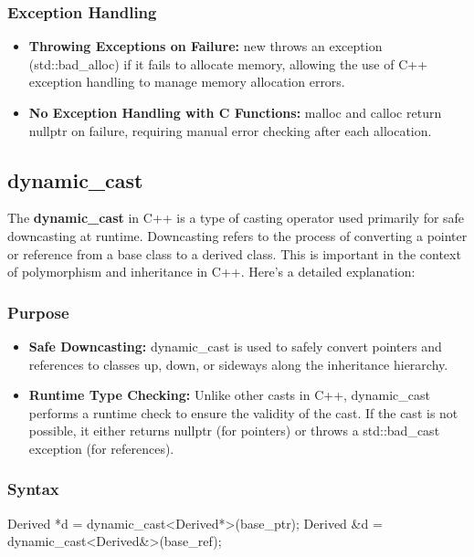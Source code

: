 \documentclass{report}
\begin{document}
    \bigbreak \noindent 
    \subsubsection{Exception Handling}
    \begin{itemize}
        \item \textbf{Throwing Exceptions on Failure:} new throws an exception (std::bad\_alloc) if it fails to allocate memory, allowing the use of C++ exception handling to manage memory allocation errors.
        \item \textbf{No Exception Handling with C Functions:} malloc and calloc return nullptr on failure, requiring manual error checking after each allocation.
    \end{itemize}

    \pagebreak 
    \bigbreak \noindent 

    \subsection{dynamic\_cast}
    \bigbreak \noindent 
    \begin{concept}
        The \textbf{dynamic\_cast} in C++ is a type of casting operator used primarily for safe downcasting at runtime. Downcasting refers to the process of converting a pointer or reference from a base class to a derived class. This is important in the context of polymorphism and inheritance in C++. Here's a detailed explanation:
    \end{concept}
    \bigbreak \noindent 
    \subsubsection{Purpose}
    \begin{itemize}
        \item \textbf{Safe Downcasting:} dynamic\_cast is used to safely convert pointers and references to classes up, down, or sideways along the inheritance hierarchy.
        \item \textbf{Runtime Type Checking:} Unlike other casts in C++, dynamic\_cast performs a runtime check to ensure the validity of the cast. If the cast is not possible, it either returns nullptr (for pointers) or throws a std::bad\_cast exception (for references).
    \end{itemize}
    \bigbreak \noindent 
    \subsubsection{Syntax}
    \bigbreak \noindent 
    \begin{cppcode}
    Derived *d = dynamic_cast<Derived*>(base_ptr);
    Derived &d = dynamic_cast<Derived&>(base_ref);
   \end{cppcode}
\end{document}
